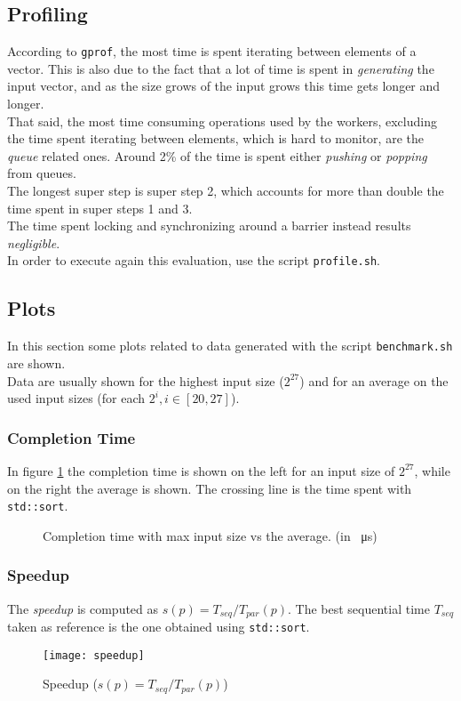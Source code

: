 \documentclass[]{article}
\def\code#1{\texttt{#1}}
\begin{document}
\subsection{Profiling}
\label{sec:profile}
According to \code{gprof}, the most time is spent iterating between elements of a vector. This is also due to the fact that a lot of time is spent in \emph{generating} the input vector, and as the size grows of the input grows this time gets longer and longer. \\
That said, the most time consuming operations used by the workers, excluding the time spent iterating between elements, which is hard to monitor, are the \emph{queue} related ones.
Around 2\% of the time is spent either \emph{pushing} or \emph{popping} from queues. \\
The longest super step is super step 2, which accounts for more than double the time spent in super steps 1 and 3.\\
The time spent locking and synchronizing around a barrier instead results \emph{negligible}. \\
In order to execute again this evaluation, use the script \code{profile.sh}.

\subsection{Plots}
\label{sec:plots}
In this section some plots related to data generated with the script \code{benchmark.sh} are shown.\\
Data are usually shown for the highest input size ($2^{27}$) and for an average on the used input sizes (for each $ 2^i, i \in [20,27]$).

\subsubsection{Completion Time}
In figure \ref{fig:execution} the completion time is shown on the left for an input size of $2^{27}$, while on the right the average is shown. The crossing line is the time spent with \code{std::sort}. 
\begin{figure}[H]
	\qquad
	\caption{Completion time with max input size vs the average. (in \SI{}{\micro \second})}
	\label{fig:execution}
\end{figure}

\subsubsection{Speedup}
The \emph{speedup} is computed as $s(p) = T_{seq}/T_{par}(p)$. The best sequential time $T_{seq}$ taken as reference is the one obtained using \code{std::sort}.
\begin{figure}[H]
	\centering
	\texttt{[image: speedup]}
	\caption{Speedup ($s(p) = T_{seq}/T_{par}(p)$)}
	\label{fig:speedup}
\end{figure}
\end{document}
